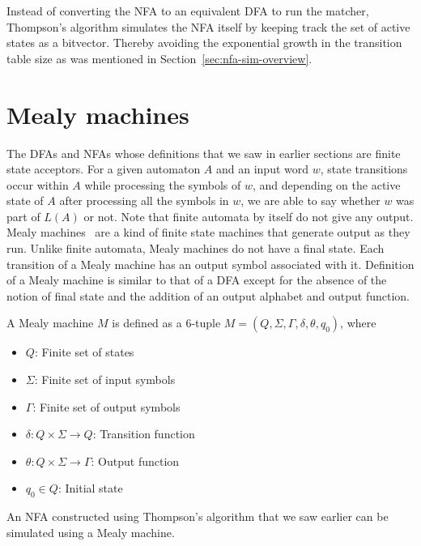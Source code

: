 Instead of converting the \gls{NFA} to an equivalent \gls{DFA} to run
the matcher, Thompson's algorithm simulates the \gls{NFA} itself by
keeping track the set of active states as a bitvector.
Thereby avoiding the exponential growth in the transition table size
as was mentioned in Section~\ref{sec:nfa-sim-overview}.


\section{Mealy machines}
The \glspl{DFA} and \glspl{NFA} whose definitions that we saw in
earlier sections are finite state acceptors.
For a given automaton $A$ and an input word $w$, state transitions
occur within $A$ while processing the symbols of $w$, and depending on
the active state of $A$ after processing all the symbols in $w$, we
are able to say whether $w$ was part of $L(A)$ or not.
Note that finite automata by itself do not give any output.
%
Mealy machines~\cite{mealy1955method} are a kind of finite state
machines that generate output as they run.
Unlike finite automata, Mealy machines do not have a final state.
Each transition of a Mealy machine has an output symbol associated
with it.
Definition of a Mealy machine is similar to that of a \gls{DFA} except
for the absence of the notion of final state and the addition of an
output alphabet and output function.

\begin{definition}
\label{def:mealy-set}
A Mealy machine $M$ is defined as a 6-tuple $M = (Q, \Sigma, \Gamma,
\delta, \theta, q_0)$, where

\begin{itemize}
\item $Q$: Finite set of states
\item $\Sigma$: Finite set of input symbols
\item $\Gamma$: Finite set of output symbols
\item $\delta: Q \times \Sigma \to Q$: Transition function
\item $\theta: Q \times \Sigma \to \Gamma$: Output function
\item $q_0 \in Q$: Initial state
\end{itemize}



An \gls{NFA} constructed using Thompson's algorithm that we saw
earlier can be simulated using a Mealy machine.
\end{definition}



